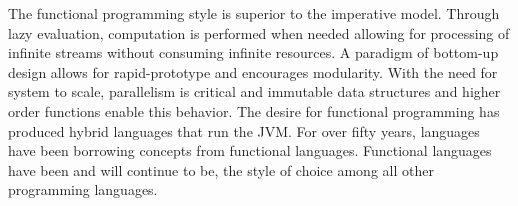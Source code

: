 \documentclass[prodmode]{acmlarge}
\begin{document}
The functional programming style is superior to the imperative model.
Through lazy evaluation, computation is performed when needed allowing
for processing of infinite streams without consuming infinite
resources.  A paradigm of bottom-up design allows for rapid-prototype
and encourages modularity.  With the need for system to scale,
parallelism is critical and immutable data structures and higher order
functions enable this behavior.  The desire for functional programming
has produced hybrid languages that run the JVM.  For over fifty years,
languages have been borrowing concepts from functional languages.
Functional languages have been and will continue to be, the style of
choice among all other programming languages.


\end{document}
